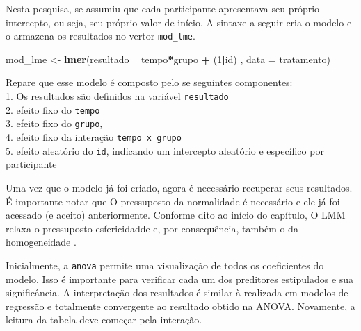 \documentclass[
]{book}
\newenvironment{Shaded}{\begin{snugshade}}{\end{snugshade}}
\newcommand{\DataTypeTok}[1]{\textcolor[rgb]{0.13,0.29,0.53}{#1}}
\newcommand{\DecValTok}[1]{\textcolor[rgb]{0.00,0.00,0.81}{#1}}
\newcommand{\KeywordTok}[1]{\textcolor[rgb]{0.13,0.29,0.53}{\textbf{#1}}}
\newcommand{\NormalTok}[1]{#1}
\newcommand{\OperatorTok}[1]{\textcolor[rgb]{0.81,0.36,0.00}{\textbf{#1}}}
\newcommand{\StringTok}[1]{\textcolor[rgb]{0.31,0.60,0.02}{#1}}
\begin{document}
Nesta pesquisa, se assumiu que cada participante apresentava seu próprio intercepto, ou seja, seu próprio valor de início. A sintaxe a seguir cria o modelo e o armazena os resultados no vertor \texttt{mod\_lme}.

\begin{Shaded}
\begin{Highlighting}[]
\NormalTok{mod_lme <-}\StringTok{ }\KeywordTok{lmer}\NormalTok{(resultado }\OperatorTok{~}\StringTok{ }\NormalTok{tempo}\OperatorTok{*}\NormalTok{grupo }\OperatorTok{+}\StringTok{ }\NormalTok{(}\DecValTok{1}\OperatorTok{|}\NormalTok{id) , }\DataTypeTok{data =}\NormalTok{ tratamento)}
\end{Highlighting}
\end{Shaded}

Repare que esse modelo é composto pelo se seguintes componentes:\\
1. Os resultados são definidos na variável \texttt{resultado}\\
2. efeito fixo do \texttt{tempo}\\
3. efeito fixo do \texttt{grupo},\\
4. efeito fixo da interação \texttt{tempo\ x\ grupo}\\
5. efeito aleatório do \texttt{id}, indicando um intercepto aleatório e específico por participante

Uma vez que o modelo já foi criado, agora é necessário recuperar seus resultados. É importante notar que O pressuposto da normalidade é necessário e ele já foi acessado (e aceito) anteriormente. Conforme dito ao início do capítulo, O LMM relaxa o pressuposto esfericidadde e, por consequência, também o da homogeneidade \citep{Quen2004}.

Inicialmente, a \texttt{anova} permite uma visualização de todos os coeficientes do modelo. Isso é importante para verificar cada um dos preditores estipulados e sua significância. A interpretação dos resultados é similar à realizada em modelos de regressão e totalmente convergente ao resultado obtido na ANOVA. Novamente, a leitura da tabela deve começar pela interação.

\begin{Shaded}
\end{Shaded}
\end{document}
